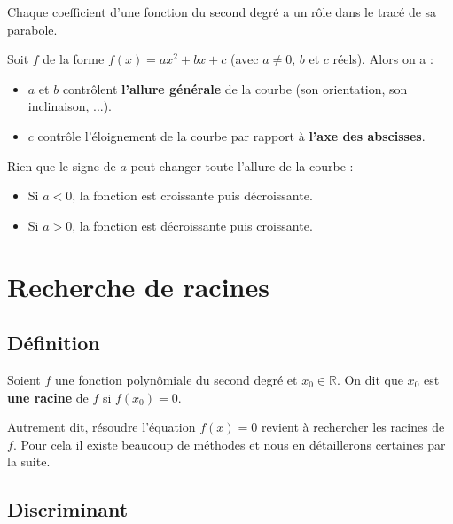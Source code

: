 	Chaque coefficient d'une fonction du second degré a un rôle dans le tracé de sa parabole.
	
	\begin{formula}
		Soit $f$ de la forme $f(x) = ax^2 + bx +c$ (avec $a \neq 0$, $b$ et $c$ réels). Alors on a :
		\begin{itemize}
			\item $a$ et $b$ contrôlent \textbf{l'allure générale} de la courbe (son orientation, son inclinaison, ...).
			\item $c$ contrôle l'éloignement de la courbe par rapport à \textbf{l'axe des abscisses}.
		\end{itemize}
	\end{formula}
	
	\begin{tip}
		Rien que le signe de $a$ peut changer toute l'allure de la courbe :
		\begin{itemize}
			\item Si $a < 0$, la fonction est croissante puis décroissante.
			\item Si $a > 0$, la fonction est décroissante puis croissante.
		\end{itemize}
	\end{tip}
	
	\section{Recherche de racines}
	
	\subsection{Définition}
	
	\begin{formula}[Définition]
		Soient $f$ une fonction polynômiale du second degré et $x_0 \in \mathbb{R}$. On dit que $x_0$ est \textbf{une racine} de $f$ si $f(x_0) = 0$.
	\end{formula}
	
	\begin{tip}
		Autrement dit, résoudre l'équation $f(x) = 0$ revient à rechercher les racines de $f$. Pour cela il existe beaucoup de méthodes et nous en détaillerons certaines par la suite.
	\end{tip}
	
	\subsection{Discriminant}
	
